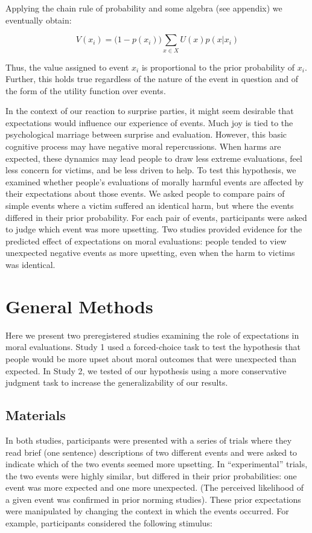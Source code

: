 \documentclass[]{article}
\begin{document}
Applying the chain rule of probability and some algebra (see appendix)
we eventually obtain:

\[V(x_i) = \big(1 - p(x_i) \big) \sum_{x \in X} U(x)p(x|x_i)\]

Thus, the value assigned to event \(x_i\) is proportional to the prior
probability of \(x_i\). Further, this holds true regardless of the
nature of the event in question and of the form of the utility function
over events.

In the context of our reaction to surprise parties, it might seem
desirable that expectations would influence our experience of events.
Much joy is tied to the psychological marriage between surprise and
evaluation. However, this basic cognitive process may have negative
moral repercussions. When harms are expected, these dynamics may lead
people to draw less extreme evaluations, feel less concern for victims,
and be less driven to help. To test this hypothesis, we examined whether
people's evaluations of morally harmful events are affected by their
expectations about those events. We asked people to compare pairs of
simple events where a victim suffered an identical harm, but where the
events differed in their prior probability. For each pair of events,
participants were asked to judge which event was more upsetting. Two
studies provided evidence for the predicted effect of expectations on
moral evaluations: people tended to view unexpected negative events as
more upsetting, even when the harm to victims was identical.

\section{General Methods}\label{general-methods}

Here we present two preregistered studies examining the role of
expectations in moral evaluations. Study 1 used a forced-choice task to
test the hypothesis that people would be more upset about moral outcomes
that were unexpected than expected. In Study 2, we tested of our
hypothesis using a more conservative judgment task to increase the
generalizability of our results.

\subsection{Materials}\label{materials}

In both studies, participants were presented with a series of trials
where they read brief (one sentence) descriptions of two different
events and were asked to indicate which of the two events seemed more
upsetting. In ``experimental'' trials, the two events were highly
similar, but differed in their prior probabilities: one event was more
expected and one more unexpected. (The perceived likelihood of a given
event was confirmed in prior norming studies). These prior expectations
were manipulated by changing the context in which the events occurred.
For example, participants considered the following stimulus:
\end{document}
